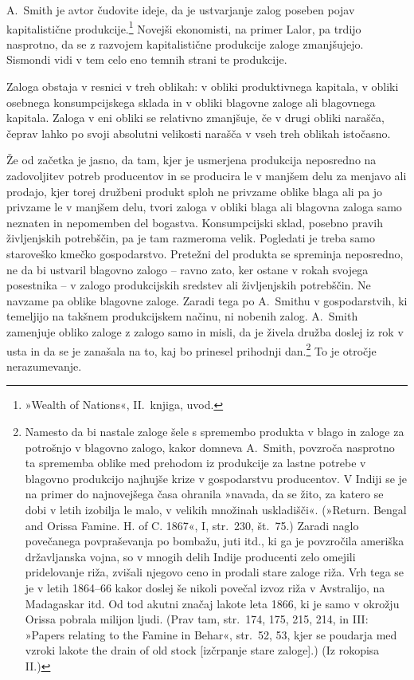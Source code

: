 \documentclass[kapital_02.tex]{subfiles}
\begin{document}
A.\ Smith je avtor čudovite ideje, da je ustvarjanje zalog poseben pojav kapitalistične produkcije.\footnote
{»Wealth of Nations«, II.\ knjiga, uvod.}
Novejši ekonomisti, na primer Lalor, pa trdijo nasprotno, da se z razvojem kapitalistične produkcije zaloge zmanjšujejo. Sismondi vidi v tem celo eno temnih strani te produkcije.

Zaloga obstaja v resnici v treh oblikah: v obliki produktivnega kapitala, v obliki osebnega konsumpcijskega sklada in v obliki blagovne zaloge ali blagovnega kapitala.
Zaloga v eni obliki se relativno zmanjšuje, če v drugi obliki narašča, čeprav lahko po svoji absolutni velikosti narašča v vseh treh oblikah istočasno.

Že od začetka je jasno, da tam, kjer je usmerjena produkcija neposredno na zadovoljitev potreb producentov in se producira le v manjšem delu za menjavo ali prodajo, kjer torej družbeni produkt sploh ne privzame oblike blaga ali pa jo privzame le v manjšem delu, tvori zaloga v obliki blaga ali blagovna zaloga samo neznaten in nepomemben del bogastva.
Konsumpcijski sklad, posebno pravih življenjskih potrebščin, pa je tam razmeroma velik. 
Pogledati je treba samo staroveško kmečko gospodarstvo. 
Pretežni del produkta se spreminja neposredno, ne da bi ustvaril blagovno zalogo -- ravno zato, ker ostane v rokah svojega posestnika -- v zalogo produkcijskih sredstev ali življenjskih potrebščin.
Ne navzame pa oblike blagovne zaloge.
Zaradi tega po A.\ Smithu v gospodarstvih, ki temeljijo na takšnem produkcijskem načinu, ni nobenih zalog. A.\ Smith zamenjuje obliko zaloge z zalogo samo in misli, da je živela družba doslej iz rok v usta in da se je zanašala na to, kaj bo prinesel prihodnji dan.\footnote
{Namesto da bi nastale zaloge šele s spremembo produkta v blago in zaloge za potrošnjo v blagovno zalogo, kakor domneva A.\ Smith, povzroča nasprotno ta sprememba oblike med prehodom iz produkcije za lastne potrebe v blagovno produkcijo najhujše krize v gospodarstvu producentov.
V Indiji se je na primer do najnovejšega časa ohranila »navada, da se žito, za katero se dobi v letih izobilja le malo, v velikih množinah uskladišči«.
(»Return. Bengal and Orissa Famine. H. of C. 1867«, I, str.\ 230, št.\ 75.)
Zaradi naglo povečanega povpraševanja po bombažu, juti itd., ki ga je povzročila ameriška državljanska vojna, so v mnogih delih Indije producenti zelo omejili pridelovanje riža, zvišali njegovo ceno in prodali stare zaloge riža.
Vrh tega se je v letih 1864--66 kakor doslej še nikoli povečal izvoz riža v Avstralijo, na Madagaskar itd.
Od tod akutni značaj lakote leta 1866, ki je samo v okrožju Orissa pobrala milijon ljudi.
(Prav tam, str.\ 174, 175, 215, 214, in III: »Papers relating to the Famine in Behar«, str.\ 52, 53, kjer se poudarja med vzroki lakote the drain of old stock [izčrpanje stare zaloge].)
(Iz rokopisa II.)}
To je otročje nerazumevanje.
\end{document}
